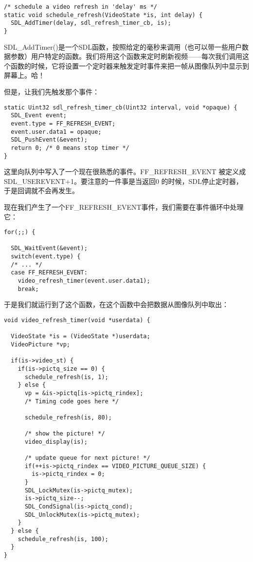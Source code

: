 \begin{lstlisting}
/* schedule a video refresh in 'delay' ms */
static void schedule_refresh(VideoState *is, int delay) {
  SDL_AddTimer(delay, sdl_refresh_timer_cb, is);
}
\end{lstlisting}

SDL_AddTimer()是一个SDL函数，按照给定的毫秒来调用（也可以带一些用户数据参数）用户特定的函数。我们将用这个函数来定时刷新视频——每次我们调用这个函数的时候，它将设置一个定时器来触发定时事件来把一帧从图像队列中显示到屏幕上。哈！

但是，让我们先触发那个事件：
\begin{lstlisting}
static Uint32 sdl_refresh_timer_cb(Uint32 interval, void *opaque) {
  SDL_Event event;
  event.type = FF_REFRESH_EVENT;
  event.user.data1 = opaque;
  SDL_PushEvent(&event);
  return 0; /* 0 means stop timer */
}
\end{lstlisting}

这里向队列中写入了一个现在很熟悉的事件。FF_REFRESH_EVENT 被定义成SDL_USEREVENT+1。要注意的一件事是当返回0 的时候，SDL停止定时器，于是回调就不会再发生。

现在我们产生了一个FF_REFRESH_EVENT事件，我们需要在事件循环中处理它：
\begin{lstlisting}
for(;;) {

  SDL_WaitEvent(&event);
  switch(event.type) {
  /* ... */
  case FF_REFRESH_EVENT:
    video_refresh_timer(event.user.data1);
    break;
\end{lstlisting}

于是我们就运行到了这个函数，在这个函数中会把数据从图像队列中取出：
\begin{lstlisting}
void video_refresh_timer(void *userdata) {

  VideoState *is = (VideoState *)userdata;
  VideoPicture *vp;

  if(is->video_st) {
    if(is->pictq_size == 0) {
      schedule_refresh(is, 1);
    } else {
      vp = &is->pictq[is->pictq_rindex];
      /* Timing code goes here */

      schedule_refresh(is, 80);

      /* show the picture! */
      video_display(is);

      /* update queue for next picture! */
      if(++is->pictq_rindex == VIDEO_PICTURE_QUEUE_SIZE) {
        is->pictq_rindex = 0;
      }
      SDL_LockMutex(is->pictq_mutex);
      is->pictq_size--;
      SDL_CondSignal(is->pictq_cond);
      SDL_UnlockMutex(is->pictq_mutex);
    }
  } else {
    schedule_refresh(is, 100);
  }
}
\end{lstlisting}

